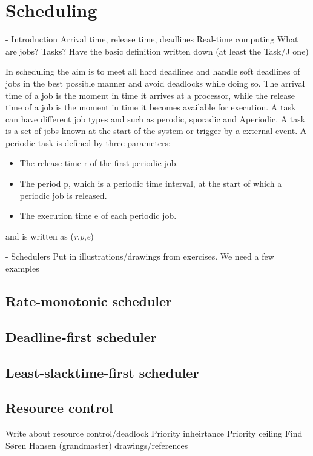 \section{Scheduling} \label{sc:scheduling}

- Introduction
Arrival time, release time, deadlines
Real-time computing
What are jobs? Tasks?
Have the basic definition written down (at least the Task/J one)


In scheduling the aim is to meet all hard deadlines and handle soft deadlines of jobs in the best possible manner and avoid deadlocks while doing so. The arrival time of a job is the moment in time it arrives at a processor, while the
release time of a job is the moment in time it becomes available for execution. A task can have different job types and such as perodic, sporadic and Aperiodic. A task is a set of jobs known at the start of the system or trigger by a external event.
A periodic task is defined by three parameters:
\begin{itemize}
	\item The release time r of the first periodic job.
	\item The period p, which is a periodic time interval, at the start of which a periodic job is released.
	\item The execution time e of each periodic job.
\end{itemize}
and is written as (\textit{r},\textit{p},\textit{e})




- Schedulers
Put in illustrations/drawings from exercises. We need a few examples
\subsection{Rate-monotonic scheduler}

\subsection{Deadline-first scheduler}

\subsection{Least-slacktime-first scheduler}


\subsection{Resource control}
Write about resource control/deadlock
Priority inheirtance
Priority ceiling
Find Søren Hansen (grandmaster) drawings/references